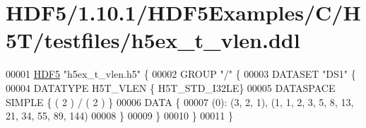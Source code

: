 \hypertarget{_h_d_f5_21_810_81_2_h_d_f5_examples_2_c_2_h5_t_2testfiles_2h5ex__t__vlen_8ddl_source}{}\section{H\+D\+F5/1.10.1/\+H\+D\+F5\+Examples/\+C/\+H5\+T/testfiles/h5ex\+\_\+t\+\_\+vlen.ddl}
\label{_h_d_f5_21_810_81_2_h_d_f5_examples_2_c_2_h5_t_2testfiles_2h5ex__t__vlen_8ddl_source}

\begin{DoxyCode}
00001 \hyperlink{namespace_h_d_f5}{HDF5} \textcolor{stringliteral}{"h5ex\_t\_vlen.h5"} \{
00002 GROUP \textcolor{stringliteral}{"/"} \{
00003    DATASET \textcolor{stringliteral}{"DS1"} \{
00004       DATATYPE  H5T\_VLEN \{ H5T\_STD\_I32LE\}
00005       DATASPACE  SIMPLE \{ ( 2 ) / ( 2 ) \}
00006       DATA \{
00007       (0): (3, 2, 1), (1, 1, 2, 3, 5, 8, 13, 21, 34, 55, 89, 144)
00008       \}
00009    \}
00010 \}
00011 \}
\end{DoxyCode}
